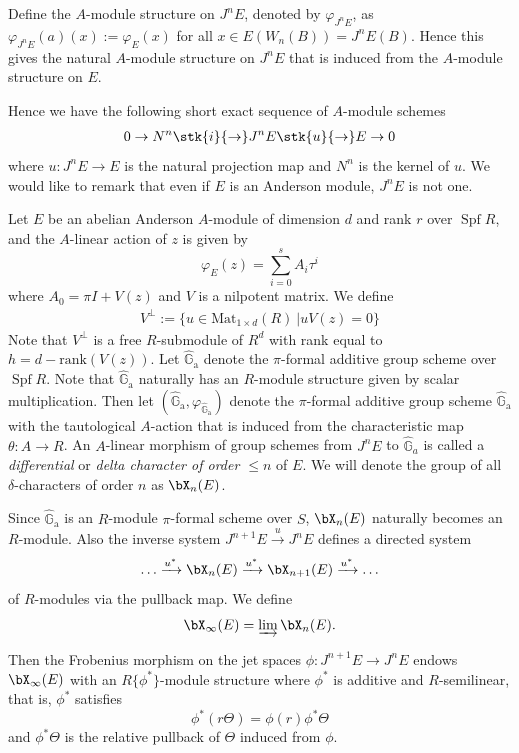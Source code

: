 \documentclass{amsart}
\def \d{\delta}
\numberwithin {equation}{section}
\newcommand{\map}{\rightarrow}
\def \vp{\varphi}
\def \d{\delta} \def \bZ{{\mathbb Z}} \def \bV{{\mathcal V}} \def \bF{{\bf F}}
\def \hG{\hat{\mathbb{G}}_{\mathrm{a}}}
\DeclareMathOperator{\Spf}{\mathrm{Spf}}
\begin{document}
Define the $A$-module structure on $J^nE$, denoted by $\vp_{J^nE}$, as
$\vp_{J^nE}(a)(x):= \vp_E(x)$ for all $x \in E(W_n(B)) = J^nE(B)$.
Hence this gives the natural $A$-module structure on $J^nE$ that
is induced from the $A$-module structure on $E$.


\color{black}
Hence we have the following short exact sequence of $A$-module schemes
\begin{align}
\label{fshort}
0 \map N^n \stk{i}{\map} J^nE \stk{u}{\map} E \map 0 
\end{align}
where $u:J^nE \map E$ is the natural projection map and $N^n$ is the
kernel of $u$. We would like to remark that even if $E$ is an Anderson module,
$J^nE$ is not one.

Let $E$ be an abelian Anderson $A$-module of dimension $d$ and rank $r$ over $\Spf R$, and the $A$-linear action of $z$ is given by  $$\varphi_{E}(z)=\displaystyle{\sum_{i=0}^{s}}A_{i}{\tau}^{i}$$
where $A_{0}=\pi I+V(z)$ and $V$ is a nilpotent matrix. We define 
\begin{align*}
	V^{\perp}:=\{u\in \mathrm{Mat}_{1\times d}(R)~| uV(z)=0\}
\end{align*}
Note that $V^{\perp}$ is a free $R$-submodule of $R^{d}$ with rank equal to $h=d-\mathrm{rank}(V(z))$. 
Let $\hG$ denote the $\pi$-formal additive group scheme over $\Spf R$. 
Note that $\hG$ 
naturally has an $R$-module structure given by scalar multiplication.
Then let $(\hG,\vp_{\hG})$ denote the $\pi$-formal additive group scheme 
$\hG$ with the tautological $A$-action that is 
induced from the characteristic map $\theta:A \map R$. 
An $A$-linear morphism of group schemes from $J^{n}E$ to $\hat{\mathbb{G}}_{a}$ is called a \textit{differential} or  \textit{delta character of order $\leq n$} of $E$. We will denote the group of all $\d$-characters of order $n$ as
 ${\bX}_{n}(E)$.

Since $\hG$ is an $R$-module $\pi$-formal scheme over $S$, $\bX_n(E)$
naturally becomes an $R$-module.
Also the inverse system $J^{n+1}E\xrightarrow{u} J^{n}E$ defines a directed system $$\ldots \xrightarrow{u^{*}} {\bX}_{n}(E)\xrightarrow{u^{*}} {\bX}_{n+1}(E) \xrightarrow{u^{*}}\ldots$$ 
of $R$-modules via the pullback map. We define 
$${\bX}_{\infty}(E)=\varinjlim {\bX}_{n}(E).$$

Then the Frobenius morphism on the jet spaces $\phi:J^{n+1}E \map J^nE$ endows 
$\bX_\infty(E)$ with an $R\{\phi^*\}$-module structure where $\phi^*$ is 
additive and $R$-semilinear, that is, $\phi^*$ satisfies 
$$
\phi^*(r \Theta ) = \phi(r) \phi^*\Theta
$$
and $\phi^*\Theta$ is the relative pullback of $\Theta$ induced from $\phi$.
\end{document}
